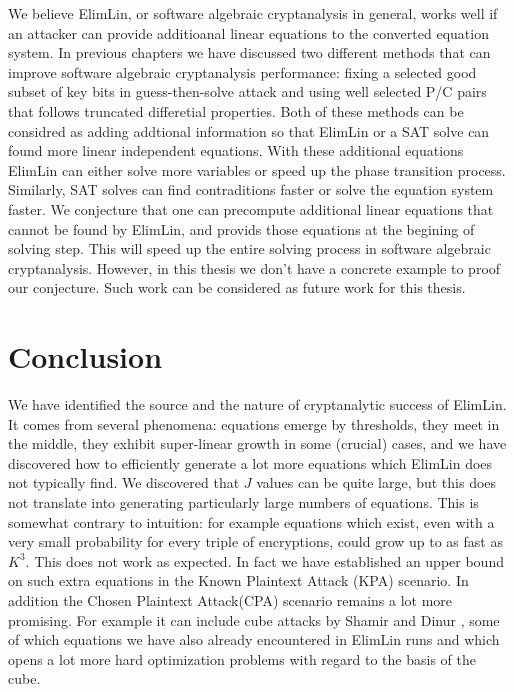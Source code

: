 We believe ElimLin, or software algebraic cryptanalysis in general, works well if an attacker can provide additioanal linear equations to the converted equation system. In previous chapters we have discussed two different methods that can improve software algebraic cryptanalysis performance: fixing a selected good subset of key bits in guess-then-solve attack and using well selected P/C pairs that follows truncated differetial properties. Both of these methods can be considred as adding addtional information so that ElimLin or a SAT solve can found more linear independent equations. With these additional equations ElimLin can either solve more variables or speed up the phase transition process. Similarly, SAT solves can find contraditions faster or solve the equation system faster. We conjecture that one can precompute additional linear equations that cannot be found by ElimLin, and provids those equations at the begining of solving step. This will speed up the entire solving process in software algebraic cryptanalysis. However, in this thesis we don't have a concrete example to proof our conjecture. Such work can be considered as future work for this thesis.
\section{Conclusion}

We have identified the source and the nature of cryptanalytic success of ElimLin. It comes from several phenomena: equations emerge by thresholds, they meet in the middle, they exhibit super-linear growth in some (crucial) cases, and we have discovered how to efficiently generate a lot more equations which ElimLin does not  typically find. We discovered that $J$ values can be quite large, but this does not translate into generating particularly large numbers of equations. This is somewhat contrary to intuition: 
for example equations which exist, even with a very small probability for every triple of encryptions, could grow up to as fast as $K^3$. This does not work as expected. 
In fact we have established an upper bound on such extra equations in the Known Plaintext Attack (KPA) scenario.  
In addition the Chosen Plaintext Attack(CPA) scenario remains a lot more promising. For example it can include cube attacks by Shamir and Dinur \cite{dinur2009cube} , some of which equations we have also already encountered in ElimLin runs and which opens a lot more hard optimization problems with regard to the basis of the cube. 

